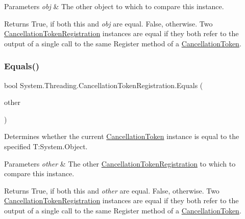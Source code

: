 \begin{DoxyParams}{Parameters}
{\em obj} & The other object to which to compare this instance.\\
\hline
\end{DoxyParams}
\begin{DoxyReturn}{Returns}
True, if both this and {\itshape obj}  are equal. False, otherwise. Two \hyperlink{}{Cancellation\+Token\+Registration} instances are equal if they both refer to the output of a single call to the same Register method of a \hyperlink{}{Cancellation\+Token}. 
\end{DoxyReturn}
\mbox{\label{struct_system_1_1_threading_1_1_cancellation_token_registration_a4f22e154e7cac436988ecb5bdc21c0f5}} 
\subsubsection{\texorpdfstring{Equals()}{Equals()}\hspace{0.1cm}{\footnotesize\ttfamily [2/2]}}
{\footnotesize\ttfamily bool System.\+Threading.\+Cancellation\+Token\+Registration.\+Equals (\begin{DoxyParamCaption}\item[{\hyperlink{struct_system_1_1_threading_1_1_cancellation_token_registration}{Cancellation\+Token\+Registration}}]{other }\end{DoxyParamCaption})\hspace{0.3cm}{\ttfamily [inline]}}



Determines whether the current \hyperlink{}{Cancellation\+Token} instance is equal to the specified T\+:\+System.\+Object. 


\begin{DoxyParams}{Parameters}
{\em other} & The other \hyperlink{}{Cancellation\+Token\+Registration} to which to compare this instance.\\
\hline
\end{DoxyParams}
\begin{DoxyReturn}{Returns}
True, if both this and {\itshape other}  are equal. False, otherwise. Two \hyperlink{}{Cancellation\+Token\+Registration} instances are equal if they both refer to the output of a single call to the same Register method of a \hyperlink{}{Cancellation\+Token}. 
\end{DoxyReturn}
\mbox{\label{struct_system_1_1_threading_1_1_cancellation_token_registration_a4cf2b501efdf0cf5ad4565b4ce3cd8c3}} 
